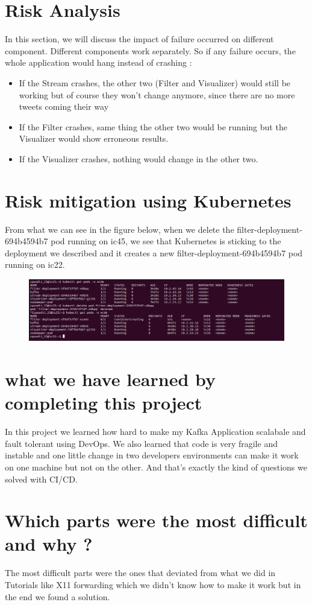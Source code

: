 \documentclass[10pt,a4paper]{article}
\begin{document}
\section{Risk Analysis}
In this section, we will discuss the impact of failure occurred on different component.
Different components work separately. So if any failure occurs, the whole application would hang instead of crashing : 
\begin{itemize}
    \item If the Stream crashes, the other two (Filter and Visualizer) would still be working but of course they won’t change anymore, since there are no more tweets coming their way
    \item If the Filter crashes, same thing the other
two would be running but the Visualizer would show erroneous results.
    \item If the Visualizer crashes, nothing would change in the other two.
\end{itemize}
\section{Risk mitigation using Kubernetes}
From what we can see in the figure below, when we delete the filter-deployment-694b4594b7 pod running on ic45, we see that Kubernetes is sticking
to the deployment we described and it creates a new filter-deployment-694b4594b7 pod running on ic22.

\begin{figure}[htbp]
\centering
\includegraphics[scale = 0.3]{screenshot.png}
\end{figure}

\section{what we have learned by completing this project}
In this project we learned how hard to make my Kafka Application scalabale and fault tolerant using DevOps. We also learned that code is very fragile and instable and one little change in two developers environments can make it work on one machine but not on the other. And that's exactly the kind of questions we solved with CI/CD.

\section{Which parts were the most difficult and why ?}
The most difficult parts were the ones that deviated from what we did in Tutorials like X11 forwarding which we didn't know how to make it work but in the end we found a solution.  
\end{document}
